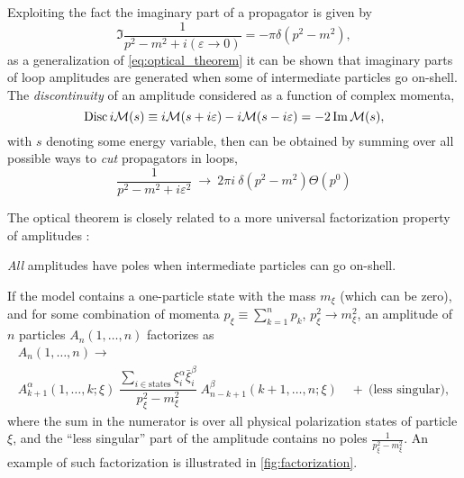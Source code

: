 
Exploiting the fact the imaginary part of a propagator is given by
\begin{equation}
  \Im\frac{1}{p^2-m^2+i(\varepsilon \to 0)} = -\pi\delta(p^2-m^2),
\end{equation}
as a generalization of \cref{eq:optical_theorem} it can be shown \cite{Eden:1966dnq,Cutkosky1960}
that imaginary parts of loop amplitudes are generated when some of intermediate particles go on-shell.
The \emph{discontinuity} of an amplitude considered as a function of complex momenta,
\begin{equation}
  \operatorname{Disc} i\mathcal{M}(s) \equiv i\mathcal{M}(s+i\varepsilon)-i\mathcal{M}(s-i\varepsilon) = -2\Im \mathcal{M}(s),
\end{equation}
with $s$ denoting some energy variable,
then can be obtained \cite{Cutkosky1960} by summing over all possible ways to \emph{cut} propagators in loops,
\begin{equation} \label{eq:cut}
  \frac{1}{p^2-m^2+i\varepsilon^2} ~\longrightarrow~ 2\pi i ~\delta(p^2-m^2) \Theta(p^{0})
\end{equation}

The optical theorem is closely related to
a more universal factorization property of amplitudes \cite{Weinberg:1995mt}:
\begin{mdframed}
  \centering
  \emph{All} amplitudes have poles when intermediate particles can go on-shell.
\end{mdframed}
If the model contains a one-particle state with the mass $m_\xi$ (which can be zero),
and for some combination of momenta $p_\xi \equiv  \sum_{k=1}^{n} p_k$, $p_\xi^2 \to m_\xi^2$,
an amplitude of $n$ particles $A_n(1,\ldots{},n)$ factorizes as
\begin{multline} \label{eq:factorization_pole}
  A_n(1,\ldots{},n) \longrightarrow \\
    A^\alpha_{k+1}(1,\ldots{},k;\xi) ~
    \dfrac{\sum_{i \in \text{states}} \xi^\alpha_i \bar\xi^\beta_i }{p_\xi^2-m_\xi^2}~ A^\beta_{n-k+1}(k+1,\ldots{},n;\xi) \quad+~ \text{(less singular)},
\end{multline}
where the sum in the numerator is over all physical polarization states of particle $\xi$, 
and the ``less singular'' part of the amplitude contains no poles $\frac{1}{p_\xi^2-m_\xi^2}$.
An example of such factorization is illustrated in \cref{fig:factorization}.

